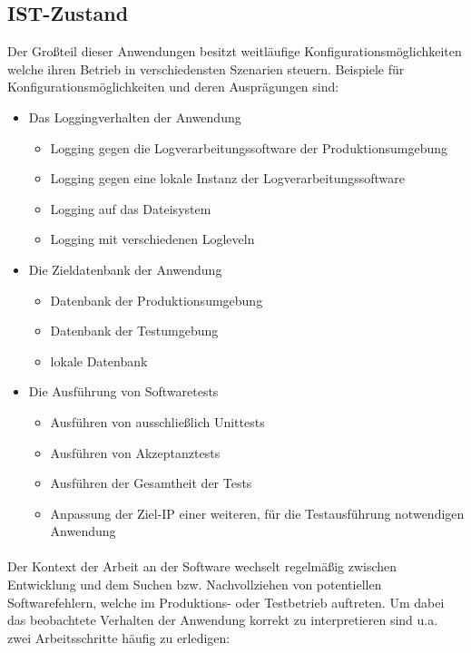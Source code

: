 \subsection{IST-Zustand}
Der Großteil dieser Anwendungen besitzt weitläufige Konfigurationsmöglichkeiten
welche ihren Betrieb in verschiedensten Szenarien steuern. Beispiele für
Konfigurationsmöglichkeiten und deren Ausprägungen sind:

\begin{itemize}
    \item Das Loggingverhalten der Anwendung
          \begin{itemize}
              \item Logging gegen die Logverarbeitungssoftware der Produktionsumgebung
              \item Logging gegen eine lokale Instanz der Logverarbeitungssoftware
              \item Logging auf das Dateisystem
              \item Logging mit verschiedenen Logleveln
          \end{itemize}
    \item Die Zieldatenbank der Anwendung \begin{itemize}
              \item Datenbank der Produktionsumgebung
              \item Datenbank der Testumgebung
              \item lokale Datenbank
          \end{itemize}
    \item Die Ausführung von Softwaretests \begin{itemize}
              \item Ausführen von ausschließlich Unittests
              \item Ausführen von Akzeptanztests
              \item Ausführen der Gesamtheit der Tests
              \item Anpassung der Ziel-IP einer weiteren, für die Testausführung
                    notwendigen Anwendung
          \end{itemize}
\end{itemize}

\paragraph{}
Der Kontext der Arbeit an der Software wechselt regelmäßig zwischen Entwicklung und
dem Suchen bzw. Nachvollziehen von potentiellen Softwarefehlern, welche im Produktions-
oder Testbetrieb auftreten. Um dabei das beobachtete Verhalten der Anwendung korrekt
zu interpretieren sind u.a. zwei Arbeitsschritte häufig zu erledigen:


